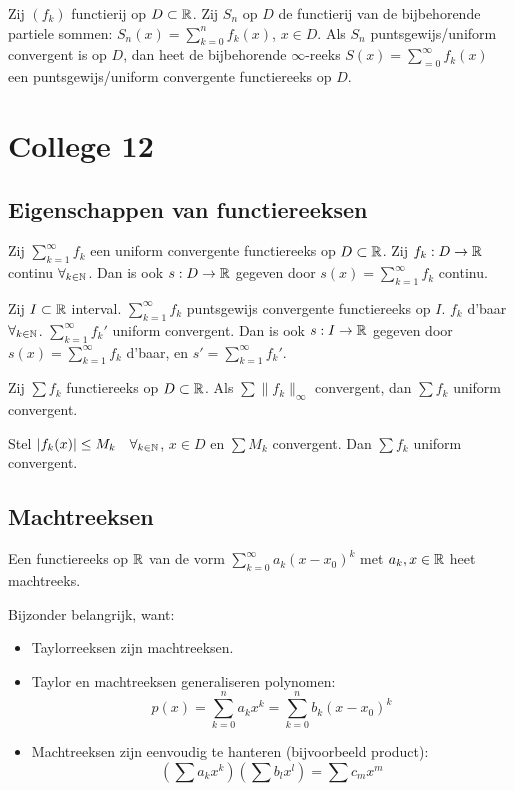 \documentclass[week=1]{homework}
\begin{document}
	\Def Zij $(f_k)$ functierij op $D \subset \mathbb{R}$. Zij $S_n$ op $D$ de functierij van de bijbehorende partiele sommen: $S_n(x) = \sum_{k=0}^{n} f_k(x)$, $x \in D$. Als $S_n$ puntsgewijs/uniform convergent is op $D$, dan heet de bijbehorende $\infty$-reeks $S(x) = \sum_{=0}^{\infty} f_k(x)$ een puntsgewijs/uniform convergente functiereeks op $D$. 

	\newpage
	\section*{College 12}
		
	\subsection*{Eigenschappen van functiereeksen}
	
	 Zij $\sum_{k=1}^{\infty} f_k$ een uniform convergente functiereeks op $D \subset \mathbb{R}$. Zij $f_k : D \to \mathbb{R}$ continu $\forall_{k \in \mathbb{N}}$. Dan is ook $s: D \to \mathbb{R}$ gegeven door $s(x) = \sum_{k=1}^{\infty} f_k$ continu. 
	
	 Zij $I \subset \mathbb{R}$ interval. $\sum_{k=1}^{\infty} f_k$ puntsgewijs convergente functiereeks op $I$. $f_k$ d'baar $\forall_{k \in \mathbb{N}}$. $\sum_{k=1}^{\infty} f_k'$ uniform convergent. Dan is ook $s: I \to \mathbb{R}$ gegeven door $s(x) = \sum_{k=1}^{\infty} f_k$ d'baar, en $s' = \sum_{k=1}^{\infty} f_k'$. 
	
	 Zij $\sum f_k$ functiereeks op $D \subset \mathbb{R}$. Als $\sum \|f_k\|_\infty$ convergent, dan $\sum f_k$ uniform convergent. 
	
	 Stel $|f_k(x)| \le M_k \quad \forall_{k \in \mathbb{N}}$, $x \in D$ en $\sum M_k$ convergent. Dan $\sum f_k$ uniform convergent. 
	
	\subsection*{Machtreeksen}
	
	\Def Een functiereeks op $\mathbb{R}$ van de vorm $\sum_{k=0}^{\infty} a_k(x-x_0)^k$ met $a_k,x \in \mathbb{R}$ heet machtreeks. 
	
	\Letop Bijzonder belangrijk, want:
	\begin{itemize}
		\item Taylorreeksen zijn machtreeksen. 
		\item Taylor en machtreeksen generaliseren polynomen: 
		\[
			p(x) = \sum_{k=0}^{n} a_k x^k = \sum_{k=0}^{n} b_k (x-x_0)^k
		\]
		\item Machtreeksen zijn eenvoudig te hanteren (bijvoorbeeld product): 
		\[
			(\sum a_k x^k)(\sum b_l x^l) = \sum c_m x^m
		\]
	\end{itemize}
	
\end{document}
